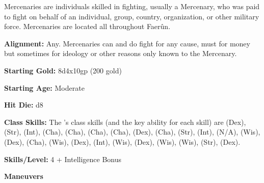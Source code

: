 
Mercenaries are individuals skilled in fighting, usually a Mercenary, who was paid to fight on behalf of an individual, group, country, organization, or other military force. Mercenaries are located all throughout Faerûn.

\textbf{Alignment:} Any. Mercenaries can and do fight for any cause, must for money but sometimes for ideology or other reasons only known to the Mercenary.

\textbf{Starting Gold:} 8d4x10gp (200 gold)

\textbf{Starting Age:} Moderate

\textbf{Hit Die:} d8

\textbf{Class Skills:} The \currentclassname{}'s class skills (and the key ability for each skill) are  (Dex),  (Str),  (Int),  (Cha),  (Cha),  (Cha),  (Cha),  (Dex),  (Cha),  (Str),  (Int),  (N/A),  (Wis),  (Dex),  (Cha),  (Wis),  (Dex),  (Int),  (Wis),  (Dex),  (Wis),  (Wis),  (Str),  (Dex).

\textbf{Skills/Level:} 4 + Intelligence Bonus

\modebab{}
\goodfor{}
\poorref{}
\poorwil{}

\begin{extraclasstable}{\textbf{Maneuvers}}
\end{extraclasstable}


